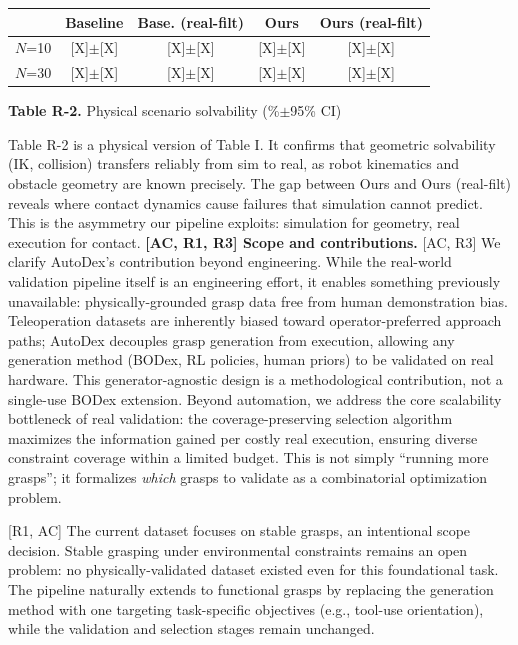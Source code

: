 \documentclass[conference]{IEEEtran}
\newcommand{\rone}{{\color{R1}R1}}
\newcommand{\rtwo}{{\color{R2}R2}}
\newcommand{\rthree}{{\color{R3}R3}}
\newcommand{\acmark}{{\color{AC}AC}}
\newcommand{\rssparagraph}[1]{{\bf #1.}}
\begin{document}
\vspace{-0.2cm}
\begin{table}[h]
\centering
\scriptsize
\begin{tabular}{l|cccc}
\toprule
& Baseline & Base. (real-filt) & Ours & Ours (real-filt) \\
\midrule
$N$=10 & {[X]}$\pm${[X]} & {[X]}$\pm${[X]} & {[X]}$\pm${[X]} & {[X]}$\pm${[X]} \\
$N$=30 & {[X]}$\pm${[X]} & {[X]}$\pm${[X]} & {[X]}$\pm${[X]} & {[X]}$\pm${[X]} \\
\bottomrule
\end{tabular}
\vspace{6pt}

{\small \textbf{Table R-2.} Physical scenario solvability (\%$\pm$95\% CI)}
\end{table}
\vspace{-0.3cm}
\noindent[\rtwo, \acmark] Table R-2 is a physical version of Table I. It confirms that geometric solvability (IK, collision) transfers reliably from sim to real, as robot kinematics and obstacle geometry are known precisely. The gap between Ours and Ours (real-filt) reveals where contact dynamics cause failures that simulation cannot predict. This is the asymmetry our pipeline exploits: simulation for geometry, real execution for contact. 
\rssparagraph{[\acmark, \rone, \rthree] Scope and contributions}
[\acmark, \rthree] We clarify AutoDex's contribution beyond engineering. While the real-world validation pipeline itself is an engineering effort, it enables something previously unavailable: physically-grounded grasp data free from human demonstration bias. Teleoperation datasets are inherently biased toward operator-preferred approach paths; AutoDex decouples grasp generation from execution, allowing any generation method (BODex, RL policies, human priors) to be validated on real hardware. This generator-agnostic design is a methodological contribution, not a single-use BODex extension.
Beyond automation, we address the core scalability bottleneck of real validation: the coverage-preserving selection algorithm maximizes the information gained per costly real execution, ensuring diverse constraint coverage within a limited budget. This is not simply ``running more grasps''; it formalizes \emph{which} grasps to validate as a combinatorial optimization problem.

[\rone, \acmark] The current dataset focuses on stable grasps, an intentional scope decision. Stable grasping under environmental constraints remains an open problem: no physically-validated dataset existed even for this foundational task. The pipeline naturally extends to functional grasps by replacing the generation method with one targeting task-specific objectives (e.g., tool-use orientation), while the validation and selection stages remain unchanged.
\end{document}
